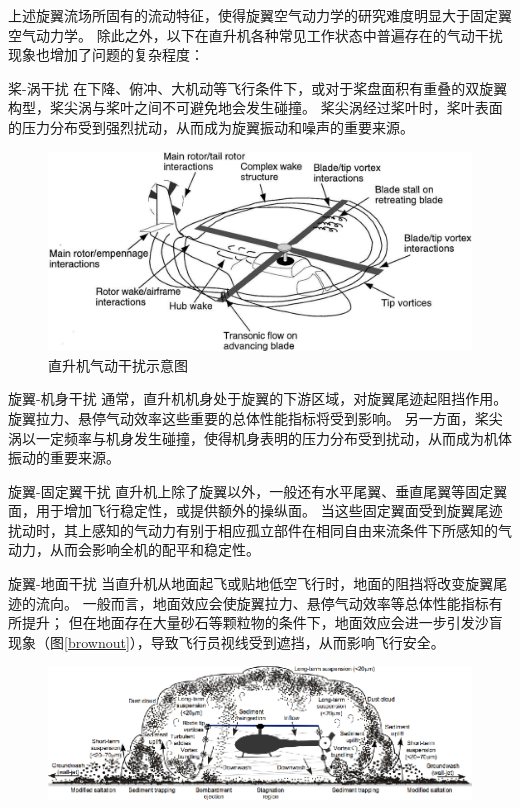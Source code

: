 \documentclass[doctor,openright,twoside,color]{buaathesis}
\begin{document}
上述旋翼流场所固有的流动特征，使得旋翼空气动力学的研究难度明显大于固定翼空气动力学。
除此之外，以下在直升机各种常见工作状态中普遍存在的气动干扰现象也增加了问题的复杂程度：
\begin{compactdesc}
  \item[桨-涡干扰]
  在下降、俯冲、大机动等飞行条件下，或对于桨盘面积有重叠的双旋翼构型，桨尖涡与桨叶之间不可避免地会发生碰撞。
  桨尖涡经过桨叶时，桨叶表面的压力分布受到强烈扰动，从而成为旋翼振动和噪声的重要来源。
\begin{figure}[t!]
    \centering
    \includegraphics[width=\textwidth]{figures/aero-interaction.jpg}
    \caption{直升机气动干扰示意图}
\end{figure}
  \item[旋翼-机身干扰]
  通常，直升机机身处于旋翼的下游区域，对旋翼尾迹起阻挡作用。
  旋翼拉力、悬停气动效率这些重要的总体性能指标将受到影响。
  另一方面，桨尖涡以一定频率与机身发生碰撞，使得机身表明的压力分布受到扰动，从而成为机体振动的重要来源。
  \item[旋翼-固定翼干扰]
  直升机上除了旋翼以外，一般还有水平尾翼、垂直尾翼等固定翼面，用于增加飞行稳定性，或提供额外的操纵面。
  当这些固定翼面受到旋翼尾迹扰动时，其上感知的气动力有别于相应孤立部件在相同自由来流条件下所感知的气动力，从而会影响全机的配平和稳定性。
  \item[旋翼-地面干扰]
  当直升机从地面起飞或贴地低空飞行时，地面的阻挡将改变旋翼尾迹的流向。
一般而言，地面效应会使旋翼拉力、悬停气动效率等总体性能指标有所提升；
  但在地面存在大量砂石等颗粒物的条件下，地面效应会进一步引发沙盲现象（图\ref{brownout}），导致飞行员视线受到遮挡，从而影响飞行安全。
\begin{figure}[t!]
    \centering
    \includegraphics[width=\textwidth]{figures/brownout.png}

\end{figure}
\end{compactdesc}
\end{document}

